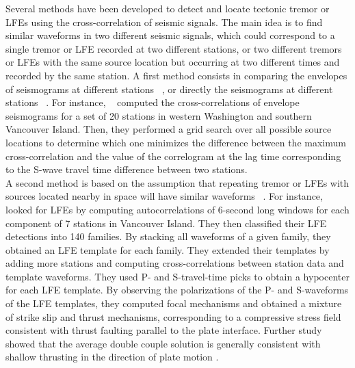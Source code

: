\documentclass[draft]{agujournal2019}
\begin{document}
Several methods have been developed to detect and locate tectonic tremor or LFEs using the cross-correlation of seismic signals. The main idea is to find similar waveforms in two different seismic signals, which could correspond to a single tremor or LFE recorded at two different stations, or two different tremors or LFEs with the same source location but occurring at two different times and recorded by the same station. A first method consists in comparing the envelopes of seismograms at different stations ~\cite{OBA_2002, WEC_2008}, or directly the seismograms at different stations ~\cite{RUB_2013}. For instance, ~ computed the cross-correlations of envelope seismograms for a set of 20 stations in western Washington and southern Vancouver Island. Then, they performed a grid search over all possible source locations to determine which one minimizes the difference between the maximum cross-correlation and the value of the correlogram at the lag time corresponding to the S-wave travel time difference between two stations. \\

A second method is based on the assumption that repeating tremor or LFEs with sources located nearby in space will have similar waveforms ~\cite{BOS_2012, ROY_2014, SHE_2006, SHE_2007_nature}. For instance, ~ looked for LFEs by computing autocorrelations of 6-second long windows for each component of 7 stations in Vancouver Island. They then classified their LFE detections into 140 families. By stacking all waveforms of a given family, they obtained an LFE template for each family. They extended their templates by adding more stations and computing cross-correlations between station data and template waveforms. They used P- and S-travel-time picks to obtain a hypocenter for each LFE template. By observing the polarizations of the P- and S-waveforms of the LFE templates, they computed focal mechanisms and obtained a mixture of strike slip and thrust mechanisms, corresponding to a compressive stress field consistent with thrust faulting parallel to the plate interface. Further study showed that the average double couple solution is generally consistent with shallow thrusting in the direction of plate motion \cite{ROY_2014}. \\
\end{document}
